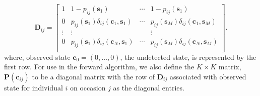 \documentclass[fleqn]{article}
\newcommand{\bs}{\ensuremath{\mathbf{s}}}
\newcommand{\bc}{\ensuremath{\mathbf{c}}}
\newcommand{\bD}{\ensuremath{\mathbf{D}}}
\newcommand{\bP}{\ensuremath{\mathbf{P}}}
\begin{document}
\begin{equation}
\bD_{ij} = \left[
\begin{array}{cccc}
1 & 1 - p_{ij}(\bs_1) & \cdots & 1 - p_{ij}(\bs_1) \\
0 & p_{ij}(\bs_1)\delta_{ij}(\bc_1,\bs_1) & \cdots & p_{ij}(\bs_M)\delta_{ij}(\bc_1,\bs_M)\\
\vdots & \vdots & & \vdots \\
0 & p_{ij}(\bs_1)\delta_{ij}(\bc_N,\bs_1) & \cdots & p_{ij}(\bs_M)\delta_{ij}(\bc_N,\bs_M)\\
\end{array}
\right].
\end{equation}
where, observed state $\bc_0 = (0,\dots,0)$, the undetected state, is represented by the first row.
For use in the forward algorithm, we also define the $K\times K$ matrix, $\bP(\bc_{ij})$ to be a diagonal matrix with the row of $\bD_{ij}$ associated with observed state for individual $i$ on occasion $j$ as the diagonal entries.
\end{document}

